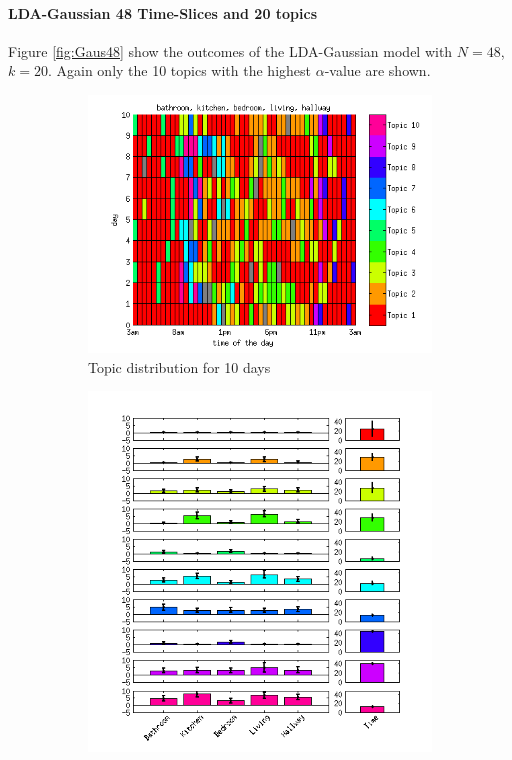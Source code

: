 \documentclass[a4paper,fleqn]{article}
\begin{document}
\paragraph{LDA-Gaussian 48 Time-Slices and 20 topics}
Figure \ref{fig:Gaus48} show the outcomes of the LDA-Gaussian model with $N=48$, $k=20$. Again only the 10 topics with the highest $\alpha$-value are shown.

\begin{figure}[h!]
 \centering
 \begin{subfigure}[b]{0.45\linewidth}
  \centering
  \includegraphics[width=\textwidth]{Pictures/GausDayHN2TS48k20.png}
  \caption{Topic distribution for 10 days}
 \end{subfigure}
 \begin{subfigure}[b]{0.45\linewidth}
  \centering
  \includegraphics[width=\textwidth]{Pictures/GausTopHN2TS48k20.png}

\end{subfigure}
\end{figure}
\end{document}
